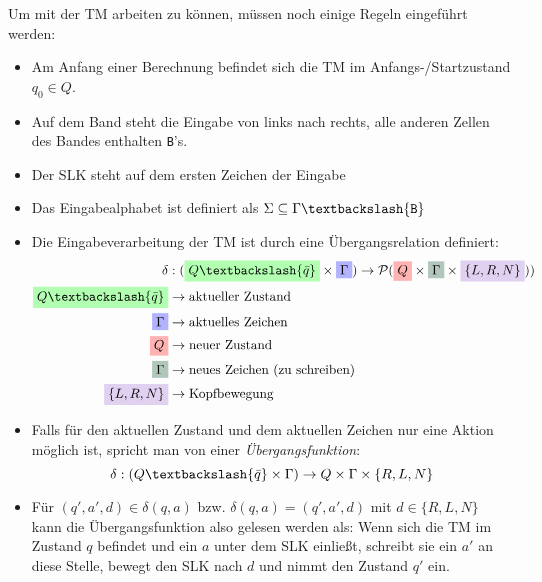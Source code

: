 \documentclass{scrartcl}%
\begin{document}
    \vspace*{0.3cm}
    Um mit der TM arbeiten zu können, müssen noch einige Regeln eingeführt werden:
    \begin{itemize}
        \item Am Anfang einer Berechnung befindet sich die TM im Anfangs-/Startzustand $q_0 \in Q$.
        \item Auf dem Band steht die Eingabe von links nach rechts,
        alle anderen Zellen des Bandes enthalten \texttt{B}'s.
        \item Der SLK steht auf dem ersten Zeichen der Eingabe
        \item Das Eingabealphabet ist definiert als $\Sigma \subseteq \Gamma \textbackslash \{\texttt{B}\}$
        \item Die Eingabeverarbeitung der TM ist durch eine Übergangsrelation definiert:
        \begin{equation*}
            \begin{align}
                \delta & :(
                \colorbox{green!30}{$Q \textbackslash \{ \bar{q} \}$} \times
                \colorbox{blue!30}{$\Gamma$} ) \rightarrow 
                \mathcal{P}(
                \colorbox{red!30}{$Q$} \times
                \colorbox{upforestgreen!30}{$\Gamma$} \times
                \colorbox{amethyst!30}{$\{L,R,N\}$})) \\
                \colorbox{green!30}{$Q \textbackslash \{ \bar{q} \}$} & \rightarrow \text{aktueller Zustand} \\
                \colorbox{blue!30}{$\Gamma$} & \rightarrow \text{aktuelles Zeichen} \\
                \colorbox{red!30}{$Q$} & \rightarrow \text{neuer Zustand} \\
                \colorbox{upforestgreen!30}{$\Gamma$} & \rightarrow \text{neues Zeichen (zu schreiben)} \\
                \colorbox{amethyst!30}{$\{L,R,N\}$} & \rightarrow \text{Kopfbewegung} \\
            \end{align}
        \end{equation*}
        \item [] Falls für den aktuellen Zustand und dem aktuellen Zeichen nur eine Aktion möglich ist,
        spricht man von einer \textit{Übergangsfunktion}:
        \begin{equation*}
            \delta : (Q \textbackslash \{ \bar{q} \} \times \Gamma) \rightarrow Q \times \Gamma \times \{ R,L,N\}
        \end{equation*}
        \item [] Für $(q',a',d) \in \delta(q,a)$ bzw. $\delta (q,a) = (q', a', d)$ mit $d \in \{R,L,N\}$
        kann die Übergangsfunktion also gelesen werden als: Wenn sich die TM im Zustand $q$ befindet und ein $a$ unter dem SLK einließt,
        schreibt sie ein $a'$ an diese Stelle, bewegt den SLK nach $d$ und nimmt den Zustand $q'$ ein.
    \end{itemize}
\end{document}
